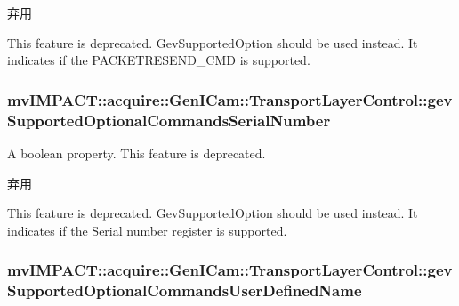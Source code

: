 \begin{DoxyRefDesc}{弃用}
\item[\hyperlink{deprecated__deprecated000074}{弃用}]This feature is deprecated. Gev\+Supported\+Option should be used instead. It indicates if the P\+A\+C\+K\+E\+T\+R\+E\+S\+E\+N\+D\+\_\+\+C\+M\+D is supported. \end{DoxyRefDesc}
\hypertarget{classmv_i_m_p_a_c_t_1_1acquire_1_1_gen_i_cam_1_1_transport_layer_control_afb42bd4fd6a0693ebd11db22fa072028}{
\subsubsection[{gev\+Supported\+Optional\+Commands\+Serial\+Number}]{ mv\+I\+M\+P\+A\+C\+T\+::acquire\+::\+Gen\+I\+Cam\+::\+Transport\+Layer\+Control\+::gev\+Supported\+Optional\+Commands\+Serial\+Number}}\label{classmv_i_m_p_a_c_t_1_1acquire_1_1_gen_i_cam_1_1_transport_layer_control_afb42bd4fd6a0693ebd11db22fa072028}


A boolean property. This feature is deprecated. 

\begin{DoxyRefDesc}{弃用}
\item[\hyperlink{deprecated__deprecated000071}{弃用}]This feature is deprecated. Gev\+Supported\+Option should be used instead. It indicates if the Serial number register is supported. \end{DoxyRefDesc}
\hypertarget{classmv_i_m_p_a_c_t_1_1acquire_1_1_gen_i_cam_1_1_transport_layer_control_a670ace5fb50f46c1b4072779e375e041}{
\subsubsection[{gev\+Supported\+Optional\+Commands\+User\+Defined\+Name}]{ mv\+I\+M\+P\+A\+C\+T\+::acquire\+::\+Gen\+I\+Cam\+::\+Transport\+Layer\+Control\+::gev\+Supported\+Optional\+Commands\+User\+Defined\+Name}}\label{classmv_i_m_p_a_c_t_1_1acquire_1_1_gen_i_cam_1_1_transport_layer_control_a670ace5fb50f46c1b4072779e375e041}


